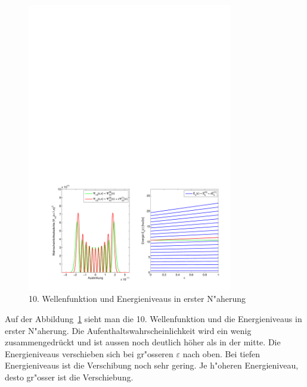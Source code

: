 \begin{refsection}
\begin{figure}[h]	%
\centering
\includegraphics[width=0.8\textwidth]{anharmonisch/images/x4/Stoerung1Wellenfunktion.pdf}
\caption{10. Wellenfunktion und Energieniveaus in erster N"aherung
\label{skript:x4_Stoerung1Wellenfunktion}}
\end{figure}

Auf der Abbildung~\ref{skript:x4_Stoerung1Wellenfunktion} sieht man die 10. Wellenfunktion und die Energieniveaus in erster N"aherung. Die Aufenthaltswahrscheinlichkeit wird ein wenig zusammengedrückt und ist aussen noch deutlich höher als in der mitte. Die Energieniveaus verschieben sich bei gr"osseren $\varepsilon$ nach oben. Bei tiefen Energieniveaus ist die Verschibung noch sehr gering. Je h"oheren Energieniveau, desto gr"osser ist die Verschiebung.


\end{refsection}
